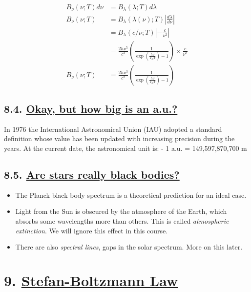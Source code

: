 \documentclass[
  letterpaper,
  DIV=11,
  numbers=noendperiod]{scrartcl}
\providecommand{\tightlist}{%
  \setlength{\itemsep}{0pt}\setlength{\parskip}{0pt}}\usepackage{longtable,booktabs,array}
\begin{document}
\begin{align}
B_\nu(\nu;T)d\nu &= B_\lambda(\lambda;T)d\lambda \\
B_\nu(\nu;T) &= B_\lambda(\lambda(\nu);T) \left|\frac{d\lambda}{d\nu}\right| \\
 &= B_\lambda(c/\nu; T) \left|-\frac{c}{\nu^2}\right| \\
  &= \frac{2h\nu^5}{c^3}\left( \frac{1}{\exp\left(\frac{h\nu}{k_BT}\right)-1} \right) \times \frac{c}{\nu^2} \\
  B_\nu(\nu;T) &= \frac{2h\nu^3}{c^2}\left( \frac{1}{\exp\left(\frac{h\nu}{k_BT}\right)-1}\right)
\end{align}

\hypertarget{okay-but-how-big-is-an-a.u.}{%
\subsection{\texorpdfstring{8.4. \protect\hyperlink{toc0_}{Okay, but how
big is an
a.u.?}}{8.4. Okay, but how big is an a.u.?}}\label{okay-but-how-big-is-an-a.u.}}

In 1976 the International Astronomical Union (IAU) adopted a standard
definition whose value has been updated with increasing precision during
the years. At the current date, the astronomical unit is: - 1 a.u. =
149,597,870,700 m

\hypertarget{are-stars-really-black-bodies}{%
\subsection{\texorpdfstring{8.5. \protect\hyperlink{toc0_}{Are stars
really black
bodies?}}{8.5. Are stars really black bodies?}}\label{are-stars-really-black-bodies}}

\begin{itemize}
\tightlist
\item
  The Planck black body spectrum is a theoretical prediction for an
  ideal case.
\item
  Light from the Sun is obscured by the atmosphere of the Earth, which
  absorbs some wavelengths more than others. This is called
  \emph{atmospheric extinction}. We will ignore this effect in this
  course.
\item
  There are also \emph{spectral lines}, gaps in the solar spectrum. More
  on this later.
\end{itemize}

\hypertarget{stefan-boltzmann-law}{%
\section{\texorpdfstring{9. \protect\hyperlink{toc0_}{Stefan-Boltzmann
Law}}{9. Stefan-Boltzmann Law}}\label{stefan-boltzmann-law}}
\end{document}
